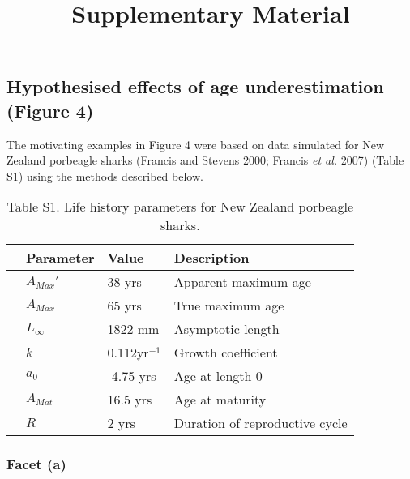 \documentclass[]{article}
\title{Supplementary Material}
\author{}
\date{}
\begin{document}
\maketitle

\subsection{Hypothesised effects of age underestimation (Figure
4)}\label{hypothesised-effects-of-age-underestimation-figure-4}

The motivating examples in Figure 4 were based on data simulated for New
Zealand porbeagle sharks (Francis and Stevens 2000; Francis \emph{et
al.} 2007) (Table S1) using the methods described below.

\captionsetup[table]{labelformat=empty}

\begin{table}[ht]
\centering
\caption{Table S1. Life history parameters for New Zealand porbeagle sharks.} 
\begin{tabular}{rlll}
  \toprule
 & Parameter & Value & Description \\ 
  \midrule
  & $A_{Max}'$ & 38 yrs & Apparent maximum age \\ 
    & $A_{Max}$ & 65 yrs & True maximum age \\ 
    & $L_{\infty}$ & 1822 mm & Asymptotic length \\ 
    & $k$ & 0.112yr$^{-1}$ & Growth coefficient \\ 
    & $a_0$ & -4.75 yrs & Age at length 0 \\ 
    & $A_{Mat}$ & 16.5 yrs & Age at maturity \\ 
    & $R$ & 2 yrs & Duration of reproductive cycle \\ 
   \bottomrule
\end{tabular}
\end{table}

\subsubsection{Facet (a)}\label{facet-a}
\end{document}
